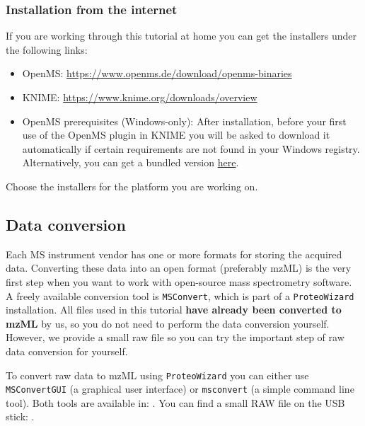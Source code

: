 \subsubsection{Installation from the internet}
If you are working through this tutorial at home you can get the installers under the following links:
\begin{itemize}
  \item OpenMS: \href{https://www.openms.de/download/openms-binaries}{ https://www.openms.de/download/openms-binaries}
  \item KNIME: \href{https://www.knime.org/downloads/overview}{ https://www.knime.org/downloads/overview}
  \item OpenMS prerequisites (Windows-only): After installation, before your first use of the OpenMS plugin in KNIME you will be asked to download it automatically if certain requirements are not found in your Windows registry. Alternatively, you can get a bundled version \href{\WindowsPrerequisitesLink}{here}.
\end{itemize}
Choose the installers for the platform you are working on.

\subsection{Data conversion}
\label{Data_Conversion}

Each MS instrument vendor has one or more formats for storing the acquired data. Converting these data into an open format (preferably mzML) is the very first step when you want to work with open-source mass spectrometry software. A freely available conversion tool is \texttt{MSConvert}, which is part of a \texttt{ProteoWizard} installation. All files used in this tutorial \textbf{have already been converted to mzML} by us, so you do not need to perform the data conversion yourself.
However, we provide a small raw file so you can try the important step of raw data conversion for yourself.


\noindent To convert raw data to mzML using \texttt{ProteoWizard} you can either use \texttt{MSConvertGUI} (a graphical user interface) or \texttt{msconvert} (a simple command line tool). Both tools are available in:
\newline
\directory{\WindowsDefaultPWizFolder}.
You can find a small RAW file on the USB stick:
.


